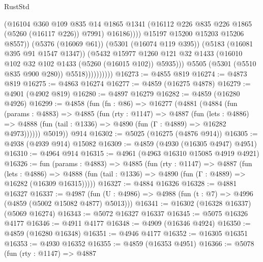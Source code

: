 \begin{lexlean}{RustStd}
\begin{coremodule}
                                    (@16104
                                      @360
                                      @109
                                      @835
                                      @14
                                      @1865
                                      @1341
                                      (@16112 @226 @835 @226 @1865 (@5260 (@16117 @226)) @7991)
                                      @16186))))
                              @15197
                              @15200
                              @15203
                              @15206
                              @8557))
                          (@5376 (@16069 @61))
                          (@5301 (@16074 @119 @395))
                          (@5183 (@16081 @395 @91 @1547 @1347))
                          (@5432
                            @15977
                            @1260
                            @121
                            @32
                            @1433
                            (@16010 @102 @32 @102 @1433 (@5260 (@16015 @102)) @5935)))
                        @5505
                        (@5301 (@5510 @835 @900 @280))
                        @5518))))))))))
@16273 := @4855 @819
@16274 := @4873 @819
@16275 := @4863 @16274
@16277 := @4859 (@16275 @4878)
@16279 := @4901 (@4902 @819)
@16280 := @4897 @16279
@16282 := @4859 (@16280 @4926)
@16299 := @4858
    (fun (fn : @86) =>
    @16277
      (@4881
        (@4884
          (fun (params : @4883) =>
          @4885
            (fun (rty : @1147) =>
            @4887
              (fun (lets : @4886) =>
              @4888 (fun (tail : @1336) => @4890 (fun (Γ : @4889) => @16282 @4973))))))
        @5019))
    @914
@16302 := @5025 (@16275 (@4876 @914))
@16305 := @4938 (@4939 @914) @15082
@16309 := @4859 (@4930 (@16305 @4947) @4951)
@16310 := @4964 @914
@16315 := @4961 (@4963 @16310 @15085 @4919 @4921)
@16326 := fun (params : @4883) =>
  @4885
    (fun (rty : @1147) =>
    @4887
      (fun (lets : @4886) =>
      @4888 (fun (tail : @1336) => @4890 (fun (Γ : @4889) => @16282 (@16309 @16315)))))
@16327 := @4884 @16326
@16328 := @4881 @16327
@16337 := @4987
    (fun (U : @4986) => @4988 (fun (t : @7) => @4996 (@4859 (@5002 @15082 @4877) @5013)))
@16341 := @16302 (@16328 @16337) (@5069 @16274)
@16343 := @5072 @16327 @16337
@16345 := @5075 @16326 @4177
@16346 := @4911 @4177
@16348 := @4909 (@16346 @4924)
@16350 := @4859 (@16280 @16348)
@16351 := @4946 @4177
@16352 := @16305 @16351
@16353 := @4930 @16352
@16355 := @4859 (@16353 @4951)
@16366 := @5078
    (fun (rty : @1147) =>
    @4887

\end{coremodule}
\end{lexlean}
